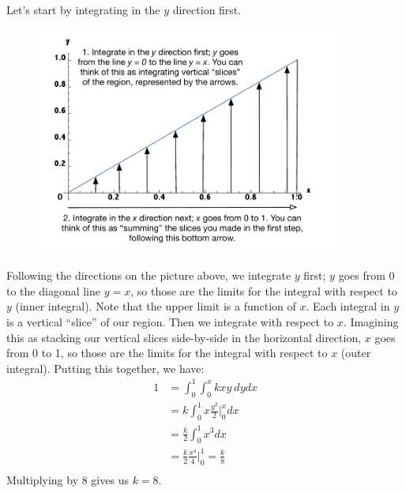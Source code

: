 \documentclass[notes.tex]{subfiles}
\begin{document}
\begin{example}
\begin{enumerate}
Let's start by integrating in the $y$ direction first. 
\begin{figure}[H]
\centering
\includegraphics[width=10cm]{region1vertfirst.pdf}
\end{figure}
Following the directions on the picture above, we integrate $y$ first; $y$ goes from 0 to the diagonal line $y = x$, so those are the limits for the integral with respect to $y$ (inner integral). Note that the upper limit is a function of $x$. Each integral in $y$ is a vertical ``slice'' of our region. Then we integrate with respect to $x$. Imagining this as stacking our vertical slices side-by-side in the horizontal direction, $x$ goes from 0 to 1, so those are the limits for the integral with respect to $x$ (outer integral). Putting this together, we have:
\begin{align*}
1 &= \int_0^1 \int_0^x k x y \: dy dx \\
&= k \int_0^1 x \frac{y^2}{2} \Bigr|_0^x dx \\
&= \frac{k}{2} \int_0^1 x^3 dx \\
&= \frac{k}{2} \frac{x^4}{4} \Bigr|_0^1 = \frac{k}{8}  \\
\end{align*}
Multiplying by 8 gives us $k = 8$.\\


\end{enumerate}
\end{example}
\end{document}
